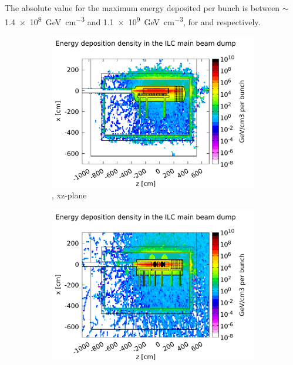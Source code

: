 The absolute value for the maximum energy deposited per bunch is between $\sim$\SI{1.4e8}{\GeV\per\centi\meter\cubed} and \SI{1.1e9}{\GeV\per\centi\meter\cubed}, for \designone and \designtwo respectively.
\begin{figure}[!t]
 \centering
  \begin{subfigure}[b]{0.49\textwidth}
   \centering
    \includegraphics[width=\textwidth]{Figures/BeamDump/Energy_deposition_xz_Design1.pdf}
   \caption{\designone, xz-plane}
   \end{subfigure}
   \hfill
    \begin{subfigure}[b]{0.49\textwidth}
   \centering
    \includegraphics[width=\textwidth]{Figures/BeamDump/Energy_deposition_xz_Design2.pdf}

\end{subfigure}
\end{figure}
